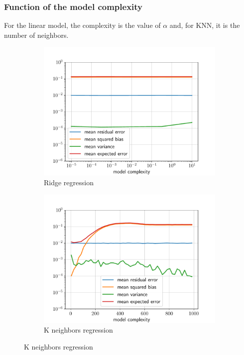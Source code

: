 \subsubsection*{Function of the model complexity}
For the linear model, the complexity is the value of $\alpha$ and, for KNN, it is the number of neighbors.
\begin{figure}[H]
    \centering
    \begin{subfigure}{0.495\textwidth}
        \includegraphics[width=\textwidth]{resources/pdf/Q3e_Ridge_model_complexity.pdf}
        \caption{Ridge regression}
    \end{subfigure}
    \begin{subfigure}{0.495\textwidth}
        \includegraphics[width=\textwidth]{resources/pdf/Q3e_KNeighborsRegressor_model_complexity.pdf}
        \caption{K neighbors regression}
    \end{subfigure}
\end{figure}
